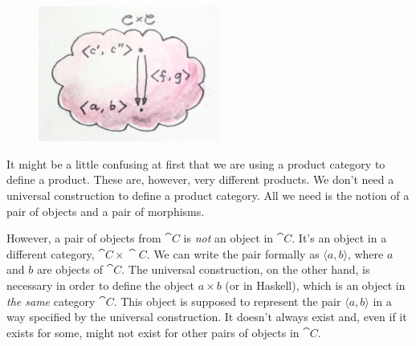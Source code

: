 \begin{figure}[H]
\centering
\includegraphics[width=60mm]{images/adj-productcat.jpg}
\end{figure}

\noindent
It might be a little confusing at first that we are using a product
category to define a product. These are, however, very different
products. We don't need a universal construction to define a product
category. All we need is the notion of a pair of objects and a pair of
morphisms.

However, a pair of objects from $\cat{C}$ is \emph{not} an object in
$\cat{C}$. It's an object in a different category, $\cat{C}\times{}\cat{C}$. We can
write the pair formally as $\langle a, b \rangle$,
where $a$ and $b$ are objects of $\cat{C}$. The universal
construction, on the other hand, is necessary in order to define the
object $a\times{}b$ (or  in Haskell), which is an object
in \emph{the same} category $\cat{C}$. This object is supposed to
represent the pair $\langle a, b \rangle$ in a way
specified by the universal construction. It doesn't always exist and,
even if it exists for some, might not exist for other pairs of objects
in $\cat{C}$.


